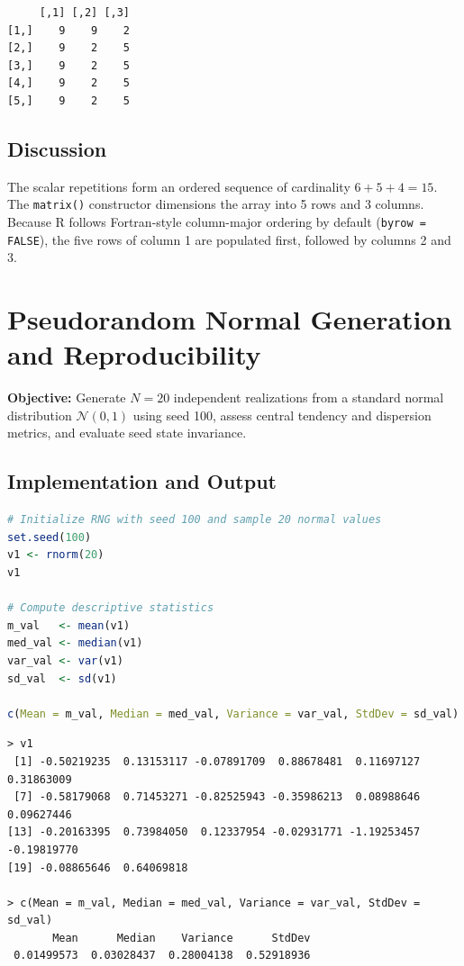 \documentclass[11pt, a4paper]{article}
\begin{document}
\begin{lstlisting}
     [,1] [,2] [,3]
[1,]    9    9    2
[2,]    9    2    5
[3,]    9    2    5
[4,]    9    2    5
[5,]    9    2    5
\end{lstlisting}

\subsection{Discussion}
The scalar repetitions form an ordered sequence of cardinality $6 + 5 + 4 = 15$. The \texttt{matrix()} constructor dimensions the array into 5 rows and 3 columns. Because R follows Fortran-style column-major ordering by default (\texttt{byrow = FALSE}), the five rows of column 1 are populated first, followed by columns 2 and 3.

\newpage

\section{Pseudorandom Normal Generation and Reproducibility}
\textbf{Objective:} Generate $N = 20$ independent realizations from a standard normal distribution $\mathcal{N}(0, 1)$ using seed 100, assess central tendency and dispersion metrics, and evaluate seed state invariance.

\subsection{Implementation and Output}
\begin{lstlisting}[language=R]
# Initialize RNG with seed 100 and sample 20 normal values
set.seed(100)
v1 <- rnorm(20)
v1

# Compute descriptive statistics
m_val   <- mean(v1)
med_val <- median(v1)
var_val <- var(v1)
sd_val  <- sd(v1)

c(Mean = m_val, Median = med_val, Variance = var_val, StdDev = sd_val)
\end{lstlisting}

\begin{lstlisting}
> v1
 [1] -0.50219235  0.13153117 -0.07891709  0.88678481  0.11697127  0.31863009
 [7] -0.58179068  0.71453271 -0.82525943 -0.35986213  0.08988646  0.09627446
[13] -0.20163395  0.73984050  0.12337954 -0.02931771 -1.19253457 -0.19819770
[19] -0.08865646  0.64069818

> c(Mean = m_val, Median = med_val, Variance = var_val, StdDev = sd_val)
       Mean      Median    Variance      StdDev 
 0.01499573  0.03028437  0.28004138  0.52918936 
\end{lstlisting}
\end{document}
